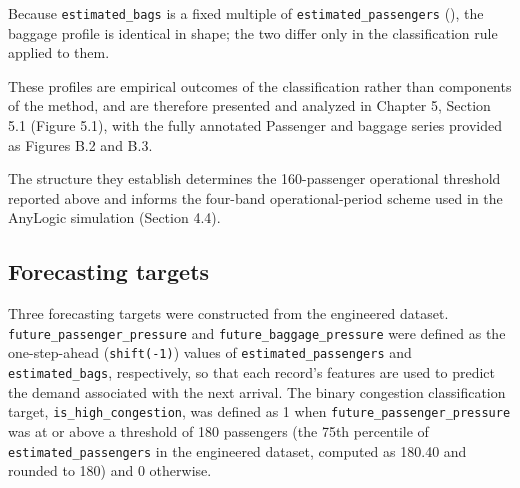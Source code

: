 Because \nolinkurl{estimated_bags} is a fixed multiple of
\nolinkurl{estimated_passengers} (), the baggage
profile is identical in shape; the two differ only in the classification
rule applied to them.

These profiles are empirical outcomes of the classification rather than
components of the method, and are therefore presented and analyzed in
Chapter 5, Section 5.1 (Figure 5.1), with the fully annotated Passenger
and baggage series provided as Figures B.2 and B.3.

The structure they establish determines the 160-passenger operational
threshold reported above and informs the four-band operational-period
scheme used in the AnyLogic simulation (Section 4.4).

\subsection{Forecasting targets}
\label{subsec:forecasting-targets}

Three forecasting targets were constructed from the engineered dataset. \nolinkurl{future_passenger_pressure} and \nolinkurl{future_baggage_pressure} were defined as the one-step-ahead (\texttt{shift(-1)}) values of \nolinkurl{estimated_passengers} and \nolinkurl{estimated_bags}, respectively, so that each record's features are used to predict the demand associated with the next arrival. The binary congestion classification target, \nolinkurl{is_high_congestion}, was defined as 1 when \nolinkurl{future_passenger_pressure} was at or above a threshold of 180 passengers (the 75th percentile of \nolinkurl{estimated_passengers} in the engineered dataset, computed as 180.40 and rounded to 180) and 0 otherwise.

